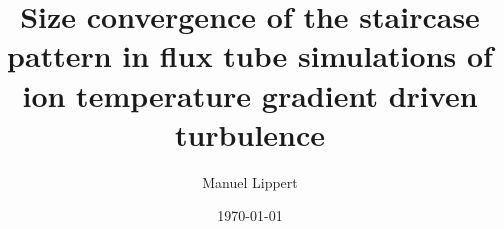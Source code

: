 \titlehead{
    \centering
    \texttt{[image: Uni\_Logo\_white\_black.png]}
}

\subject{\normalfont Bachelor Thesis}
\title{Size convergence of the \boldmath{$\exb$} staircase pattern in flux tube simulations of ion temperature gradient driven turbulence}
\author{Manuel Lippert}
\date{\today}
\publishers{\textbf{Instuitut for Theoretical Plasma Physics}\\
\vspace*{2em}
Supervisors:\\
Prof.\,Arthur\,G.\,Peeters\\
Dr.\,Florian\,Rath}